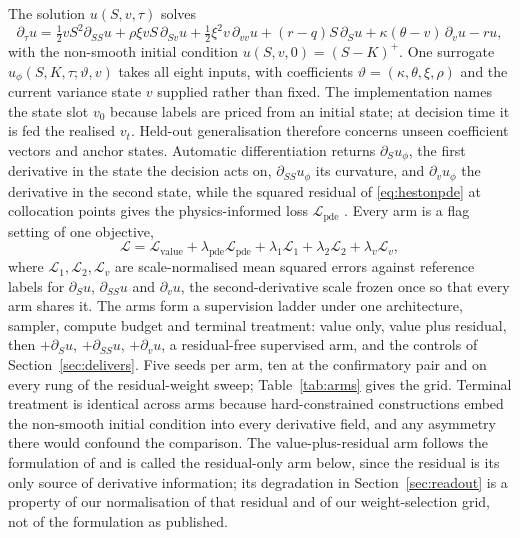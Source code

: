 \documentclass{article}
\begin{document}
The solution $u(S, v, \tau)$ solves
\begin{equation}\label{eq:hestonpde}
\partial_\tau u=\tfrac12 vS^{2}\partial_{SS}u+\rho\xi vS\,\partial_{Sv}u
+\tfrac12\xi^{2}v\,\partial_{vv}u+(r-q)S\,\partial_{S}u
+\kappa(\theta-v)\,\partial_{v}u-ru,
\end{equation}
with the non-smooth initial condition $u(S,v,0)=(S-K)^{+}$. One surrogate
$u_\phi(S,K,\tau;\vartheta,v)$ takes all eight inputs, with coefficients
$\vartheta=(\kappa,\theta,\xi,\rho)$ and the current variance state $v$ supplied
rather than fixed. The implementation names the state slot $v_0$ because labels are
priced from an initial state; at decision time it is fed the realised $v_t$.
Held-out generalisation therefore concerns unseen coefficient vectors and anchor
states. Automatic differentiation returns $\partial_S u_\phi$,
the first derivative in the state the decision acts on, $\partial_{SS}u_\phi$ its
curvature, and $\partial_v u_\phi$ the derivative in the second state, while the
squared residual of \eqref{eq:hestonpde} at collocation points gives the
physics-informed loss $\mathcal{L}_{\mathrm{pde}}$ \citep{raissi2019physics}. Every
arm is a flag setting of one objective,
\begin{equation}\label{eq:loss}
\mathcal{L}=\mathcal{L}_{\mathrm{value}}
+\lambda_{\mathrm{pde}}\mathcal{L}_{\mathrm{pde}}
+\lambda_{1}\mathcal{L}_{1}+\lambda_{2}\mathcal{L}_{2}
+\lambda_{v}\mathcal{L}_{v},
\end{equation}
where $\mathcal{L}_{1},\mathcal{L}_{2},\mathcal{L}_{v}$ are scale-normalised mean
squared errors against reference labels for $\partial_S u$, $\partial_{SS}u$ and
$\partial_v u$, the second-derivative scale frozen once so that every arm shares it.
The arms form a supervision ladder under one architecture, sampler, compute budget
and terminal treatment: value only, value plus residual, then $+\partial_S u$,
$+\partial_{SS}u$, $+\partial_v u$, a residual-free supervised arm, and the controls
of Section~\ref{sec:delivers}. Five seeds per arm, ten at the confirmatory pair and
on every rung of the residual-weight sweep; Table~\ref{tab:arms} gives the grid.
Terminal treatment is identical across arms because hard-constrained constructions
\citep{lagaris1998artificial} embed the non-smooth initial condition into every
derivative field, and any asymmetry there would confound the comparison. The
value-plus-residual arm follows the formulation of \citet{hainaut2024option} and is
called the residual-only arm below, since the residual is its only source of
derivative information; its degradation in Section~\ref{sec:readout} is a property
of our normalisation of that residual and of our weight-selection grid, not of the
formulation as published.
\end{document}
